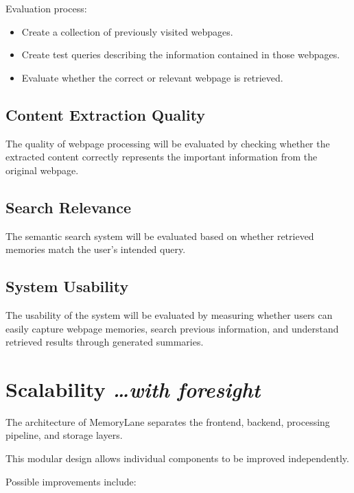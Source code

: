 \documentclass[11pt,a4paper]{article}
\newcommand{\BvrHint}[1]{%
  {\normalfont\normalsize\itshape\hfill #1}}
\begin{document}
Evaluation process:

\begin{itemize}[leftmargin=0.7cm]

\item Create a collection of previously visited webpages.

\item Create test queries describing the information contained in those webpages.

\item Evaluate whether the correct or relevant webpage is retrieved.

\end{itemize}


\subsection{Content Extraction Quality}

The quality of webpage processing will be evaluated by checking whether the extracted content correctly represents the important information from the original webpage.


\subsection{Search Relevance}

The semantic search system will be evaluated based on whether retrieved memories match the user's intended query.


\subsection{System Usability}

The usability of the system will be evaluated by measuring whether users can easily capture webpage memories, search previous information, and understand retrieved results through generated summaries.


\section{Scalability %
\BvrHint{\ldots with foresight}}

The architecture of MemoryLane separates the frontend, backend, processing pipeline, and storage layers.

This modular design allows individual components to be improved independently.

Possible improvements include:
\end{document}
